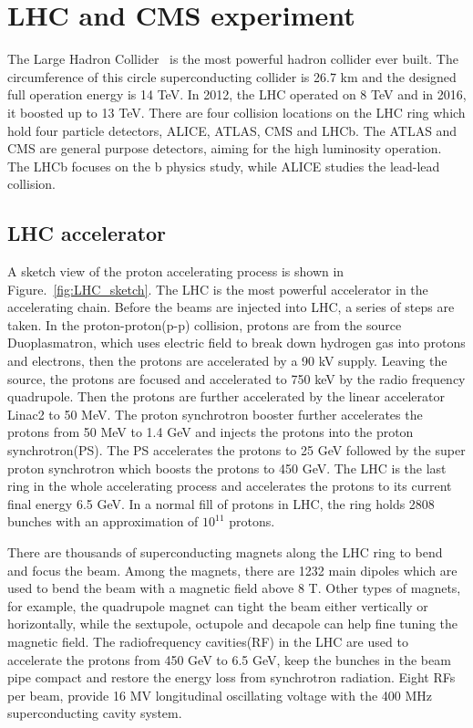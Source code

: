 \chapter{LHC and CMS experiment}

The Large Hadron Collider~\cite{LHC_refer} is the most powerful hadron collider ever built. The circumference of this circle superconducting collider is 26.7 km and the designed full operation energy is 14 TeV. In 2012, the LHC operated on 8 TeV and in 2016, it boosted up to 13 TeV. There are four collision locations on the LHC ring which hold four particle detectors, ALICE, ATLAS, CMS and LHCb. The ATLAS and CMS are general purpose detectors, aiming for the high luminosity operation. The LHCb focuses on the b physics study, while ALICE studies the lead-lead collision.
\section{LHC accelerator}

A sketch view of the proton accelerating process is shown in Figure.~\ref{fig:LHC_sketch}. The LHC is the most powerful accelerator in the accelerating chain. Before the beams are injected into LHC, a series of steps are taken. In the proton-proton(p-p) collision, protons are from the source Duoplasmatron, which uses electric field to break down hydrogen gas into protons and electrons, then the protons are accelerated by a 90 kV supply. Leaving the source, the protons are focused and accelerated to 750 keV by the radio frequency quadrupole. Then the protons are further accelerated by the linear accelerator Linac2 to 50 MeV. The proton synchrotron booster further accelerates the protons from 50 MeV to 1.4 GeV and injects the protons into the proton synchrotron(PS). The PS accelerates the protons to 25 GeV followed by the super proton synchrotron which boosts the protons to 450 GeV. The LHC is the last ring in the whole accelerating process and accelerates the protons to its current final energy 6.5 GeV. In a normal fill of protons in LHC, the ring holds 2808 bunches with an approximation of $10^{11}$ protons.

There are thousands of superconducting magnets along the LHC ring to bend and focus the beam. Among the magnets, there are 1232 main dipoles which are used to bend the beam with a magnetic field above 8 T. Other types of magnets, for example, the quadrupole magnet can tight the beam either vertically or horizontally, while the sextupole, octupole and decapole can help fine tuning the magnetic field. The radiofrequency cavities(RF) in the LHC are used to accelerate the protons from 450 GeV to 6.5 GeV, keep the bunches in the beam pipe compact and restore the energy loss from synchrotron radiation. Eight RFs per beam, provide 16 MV  longitudinal oscillating voltage with the 400 MHz superconducting cavity system. 

